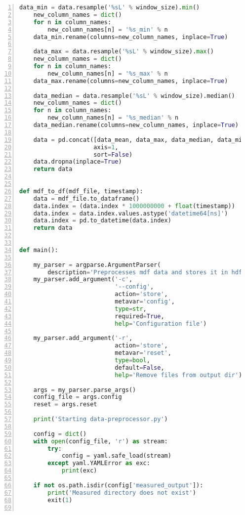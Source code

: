 \begin{lstlisting}[frame=lines, caption=Ausschnitt Fahreridentifikation, captionpos=b, label = lst:a_sw_dp, numbers=left, language=Python, showstringspaces=false, basicstyle=\footnotesize]
    data_min = data.resample('%sL' % window_size).min()
    new_column_names = dict()
    for n in column_names:
        new_column_names[n] = '%s_min' % n
    data_min.rename(columns=new_column_names, inplace=True)

    data_max = data.resample('%sL' % window_size).max()
    new_column_names = dict()
    for n in column_names:
        new_column_names[n] = '%s_max' % n
    data_max.rename(columns=new_column_names, inplace=True)

    data_median = data.resample('%sL' % window_size).median()
    new_column_names = dict()
    for n in column_names:
        new_column_names[n] = '%s_median' % n
    data_median.rename(columns=new_column_names, inplace=True)

    data = pd.concat([data_mean, data_max, data_median, data_min, data_std],
                     axis=1,
                     sort=False)
    data.dropna(inplace=True)
    return data


def mdf_to_df(mdf_file, timestamp):
    data = mdf_file.to_dataframe()
    data.index = (data.index * 1000000000 + float(timestamp))
    data.index = data.index.values.astype('datetime64[ns]')
    data.index = pd.to_datetime(data.index)
    return data


def main():

    my_parser = argparse.ArgumentParser(
        description='Preprocesses mdf data and stores it in hdf5 file')
    my_parser.add_argument('-c',
                           '--config',
                           action='store',
                           metavar='config',
                           type=str,
                           required=True,
                           help='Configuration file')

    my_parser.add_argument('-r',
                           action='store',
                           metavar='reset',
                           type=bool,
                           default=False,
                           help='Remove files from output dir')

    args = my_parser.parse_args()
    config_file = args.config
    reset = args.reset

    print('Starting data-preprocessor.py')

    config = dict()
    with open(config_file, 'r') as stream:
        try:
            config = yaml.safe_load(stream)
        except yaml.YAMLError as exc:
            print(exc)

    if not os.path.isdir(config['measured_output']):
        print('Measured directory does not exist')
        exit(1)


\end{lstlisting}

